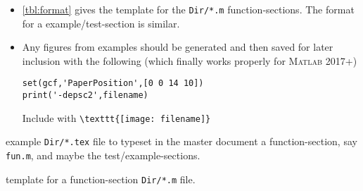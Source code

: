 \begin{itemize}
\item \autoref{tbl:format} gives the template for the \verb|Dir/*.m| function-sections.
The format for a example\slash test-section is similar.


\item Any figures from examples should be generated and then saved for later inclusion with the following (which finally works properly for \textsc{Matlab} 2017+)
\begin{verbatim}
set(gcf,'PaperPosition',[0 0 14 10])
print('-depsc2',filename)
\end{verbatim}
Include with \quad \verb|\texttt{[image: filename]}|

\end{itemize}


\begin{table}
\caption{\label{tbl:funtex}example \texttt{Dir/*.tex} file to typeset in the master document a function-section, say \texttt{fun.m}, and maybe the test\slash example-sections.}
\end{table}
\begin{table}
\caption{\label{tbl:format}template for a function-section \texttt{Dir/*.m} file.}
\end{table}


